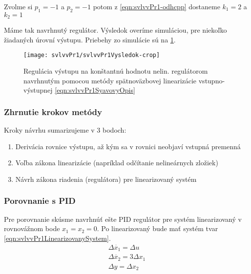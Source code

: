 \documentclass[../main.tex]{subfiles}
\begin{document}
    Zvolme si $p_1 = -1$ a $p_2 = -1$ potom z \cref{eqn:svlvvPr1-odhcpp} dostaneme $k_1=2$ a $k_2 = 1$

	Máme tak navrhnutý regulátor. Výsledok overíme simuláciou, pre niekoľko žiadaných úrovní výstupu. Priebehy zo simulácie sú na \cref{fig:svlvvPr1Vysledok}.
	\begin{figure}[h!]
		\centering
		\texttt{[image: svlvvPr1/svlvvPr1Vysledok-crop]}
		\caption{Regulácia výstupu na konštantnú hodnotu nelin. regulátorom navrhnutým pomocou metódy spätnoväzbovej linearizácie vstupno-výstupnej \cref{eqn:svlvvPr1SyavovyOpis}}
		\label{fig:svlvvPr1Vysledok}
	\end{figure}

    \subsubsection{Zhrnutie krokov metódy}
    Kroky návrhu sumarizujeme v 3 bodoch:
    \begin{enumerate}
        \item Derivácia rovnice výstupu, až kým sa v rovnici neobjaví vstupná premenná
        \item Voľba zákona linearizácie (napríklad odčítanie nelineárnych zložiek)
        \item Návrh zákona riadenia (regulátora) pre linearizovaný systém
    \end{enumerate}

    \subsubsection{Porovnanie s PID}
	Pre porovnanie skúsme navrhnúť ešte PID regulátor pre systém linearizovaný v rovnovážnom bode $x_1 = x_2 = 0$. Po linearizovaný bude mať systém tvar \cref{eqn:svlvvPr1LinearizovanySystem}. 
	\begin{equation}
	\begin{gathered}
	\Delta \dot{x_1}  = \Delta u \\
	\Delta \dot{x_2} = 3\Delta x_1 \\
	\Delta y = \Delta  x_2
	\end{gathered}
	\label{eqn:svlvvPr1LinearizovanySystem}
	\end{equation}
\end{document}
